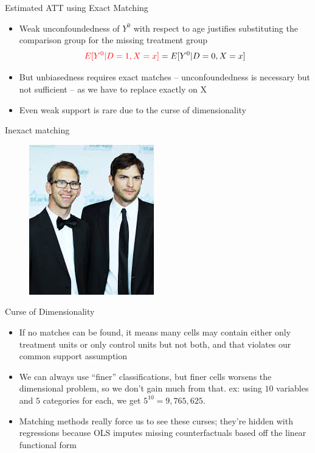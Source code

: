 \documentclass{beamer}
\begin{document}
\begin{frame}{Estimated ATT using Exact Matching}


\begin{itemize}
\item Weak unconfoundedness of $Y^0$ with respect to age justifies substituting the comparison group for the missing treatment group $$\textcolor{red}{E[Y^0|D=1, X=x]} = E[Y^0|D=0, X=x]$$
\item But unbiasedness requires exact matches -- unconfoundedness is necessary but not sufficient -- as we have to replace exactly on X
\item Even weak support is rare due to the curse of dimensionality
\end{itemize}

\end{frame}





\begin{frame}{Inexact matching}

\begin{figure}[!t]\centering
\includegraphics[scale=0.75]{./lecture_includes/fraternal_twins}
\end{figure}

\end{frame}


\begin{frame}{Curse of Dimensionality}
	
	\begin{itemize}
	\item If no matches can be found, it means many cells may contain either only treatment units or only control units but not both, and that violates our common support assumption
	\item We can always use ``finer'' classifications, but finer cells worsens the dimensional problem, so we don't gain  much from that.  ex: using $10$ variables and $5$ categories for each, we get $5^{10} = 9,765,625$.  
	\item Matching methods really force us to see these curses; they're hidden with regressions because OLS imputes missing counterfactuals based off the linear functional form
	\end{itemize}
\end{frame}	
\end{document}
